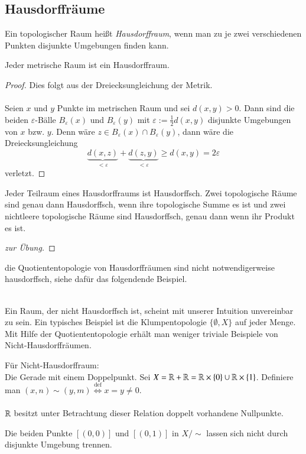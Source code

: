 \documentclass[a4paper,10pt]{scrartcl}
\newcommand{\eps}{\varepsilon}
\begin{document}
\subsection{Hausdorffräume}
\begin{df}
 Ein topologischer Raum heißt \emph{Hausdorffraum}, wenn man zu je zwei verschiedenen Punkten disjunkte Umgebungen finden kann.
\\ \fixme[fig13]
\end{df}
\begin{st}
Jeder metrische Raum ist ein Hausdorffraum. 
\end{st}
\begin{proof}
Dies folgt aus der Dreiecksungleichung der Metrik. \\
 \fixme[fig14] \\
Seien $x$ und $y$ Punkte im metrischen Raum und sei $d(x,y)>0$.
Dann sind die beiden $\eps$-Bälle $B_\eps(x)$ und $B_\eps(y)$ mit $\eps:=\frac{1}{2}d(x,y)$ disjunkte Umgebungen von $x$ bzw. $y$. Denn 
wäre $z\in B_\eps(x) \cap B_\eps(y)$, dann wäre die Dreiecksungleichung
\[
\underbrace{d(x,z)}_{<\eps}+\underbrace{d(z,y)}_{<\eps}\ge d(x,y)=2\eps
\]        
verletzt.
\end{proof}
\begin{st}
Jeder Teilraum eines Hausdorffraums ist Hausdorffsch. Zwei topologische Räume sind genau dann Hausdorffsch, wenn ihre topologische Summe es ist und zwei nichtleere topologische Räume sind Hausdorffsch, genau dann wenn ihr Produkt es ist. 
\end{st}
\begin{proof}[zur Übung]\end{proof}
\begin{note*}
die Quotiententopologie von Hausdorffräumen sind nicht notwendigerweise hausdorffsch, siehe dafür das folgendende Beispiel. \\
\end{note*}
\fixme[fig15]\\
Ein Raum, der nicht Hausdorffsch ist, scheint mit unserer Intuition unvereinbar zu sein.  Ein typisches Beispiel ist die Klumpentopologie $\{\emptyset, X\}$ auf jeder Menge. Mit Hilfe der Quotiententopologie erhält man weniger triviale Beispiele von Nicht-Hausdorffräumen.
\begin{ex*} Für Nicht-Hausdorffraum:\\
Die Gerade mit einem Doppelpunkt. Sei $ X=\mathbb{R}+\mathbb{R}=\mathbb{R}\times \{0\}\cup \mathbb{R}\times \{1\} $. Definiere man $ (x,n)\sim (y,m)\stackrel{\text{def}}{\iff} x=y\neq 0 $. \\
\fixme[fig16]\\
$ \mathbb{R} $ besitzt unter Betrachtung dieser Relation doppelt vorhandene Nullpunkte.

Die beiden Punkte $[(0,0)]$ und $[(0,1)]$ in $ X/\sim $ lassen sich nicht durch disjunkte Umgebung trennen.\\
\fixme[fig17]\\
\end{ex*}
\end{document}
